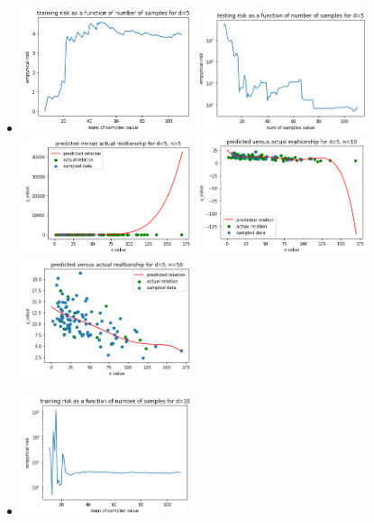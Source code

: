 \documentclass{article}
\begin{document}
\begin{enumerate}
\begin{itemize}
        \item\includegraphics[width=5cm]{homework/homework_1/training_2.png}
    \includegraphics[width=5cm]{homework/homework_1/testing_2.png}
    \includegraphics[width=5cm]{homework/homework_1/2_1.png}
    \includegraphics[width=5cm]{homework/homework_1/2_2.png}
    \includegraphics[width=5cm]{homework/homework_1/2_3.png}
        \item\includegraphics[width=5cm]{homework/homework_1/training_3.png}

\end{itemize}
\end{enumerate}
\end{document}
